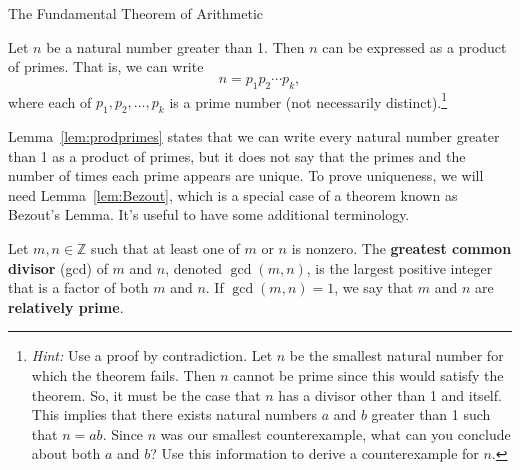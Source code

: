 \begin{section}{The Fundamental Theorem of Arithmetic}
\begin{lemma}\label{lem:prodprimes}
Let $n$ be a natural number greater than 1.  Then $n$ can be expressed as a product of primes.  That is, we can write
\[
n=p_1 p_2 \cdots p_k,
\]
where each of $p_1, p_2, \ldots, p_k$ is a prime number (not necessarily distinct).\footnote{\emph{Hint:} Use a proof by contradiction.  Let $n$ be the smallest natural number for which the theorem fails.  Then $n$ cannot be prime since this would satisfy the theorem.  So, it must be the case that $n$ has a divisor other than 1 and itself.  This implies that there exists natural numbers $a$ and $b$ greater than 1 such that $n=ab$.  Since $n$ was our smallest counterexample, what can you conclude about both $a$ and $b$?  Use this information to derive a counterexample for $n$.}
\end{lemma}


%

Lemma~\ref{lem:prodprimes} states that we can write every natural number greater than 1 as a product of primes, but it does not say that the primes and the number of times each prime appears are unique.  To prove uniqueness, we will need Lemma~\ref{lem:Bezout}, which is a special case of a theorem known as Bezout's Lemma. It's useful to have some additional terminology.

\begin{definition}
Let $m,n\in\mathbb{Z}$ such that at least one of $m$ or $n$ is nonzero.  The \textbf{greatest common divisor} (gcd) of $m$ and $n$, denoted $\gcd(m,n)$, is the largest positive integer that is a factor of both $m$ and $n$. If $\gcd(m,n)=1$, we say that $m$ and $n$ are \textbf{relatively prime}.
\end{definition}


\end{section}
